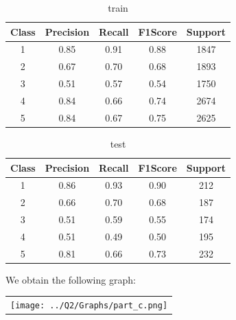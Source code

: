 \begin{enumerate}[label=(\alph*)]
\begin{enumerate}[label=\roman*.]
\begin{table}[!htb]
                        \centering
                        \begin{tabular}{ccccc}
                            \hline
                            Class & Precision & Recall & F1Score & Support \\ \hline
                            1     & 0.85      & 0.91   & 0.88    & 1847    \\
                            2     & 0.67      & 0.70   & 0.68    & 1893    \\
                            3     & 0.51      & 0.57   & 0.54    & 1750    \\
                            4     & 0.84      & 0.66   & 0.74    & 2674    \\
                            5     & 0.84      & 0.67   & 0.75    & 2625    \\ \hline
                        \end{tabular}
                        \caption{train}
                        \label{part c train depth 4}
                    \end{table}
                    \begin{table}[!htb]
                        \centering
                        \begin{tabular}{ccccc}
                            \hline
                            Class & Precision & Recall & F1Score & Support \\ \hline
                            1     & 0.86      & 0.93   & 0.90    & 212     \\
                            2     & 0.66      & 0.70   & 0.68    & 187     \\
                            3     & 0.51      & 0.59   & 0.55    & 174     \\
                            4     & 0.51      & 0.49   & 0.50    & 195     \\
                            5     & 0.81      & 0.66   & 0.73    & 232     \\ \hline
                        \end{tabular}
                        \caption{test}
                        \label{part c test depth 4}
                    \end{table}
                    \newpage


          \end{enumerate}
          We obtain the following graph:
          \begin{center}
              \begin{tabular}{c}
                  \texttt{[image: ../Q2/Graphs/part\_c.png]}
              \end{tabular}
          \end{center}


\end{enumerate}
